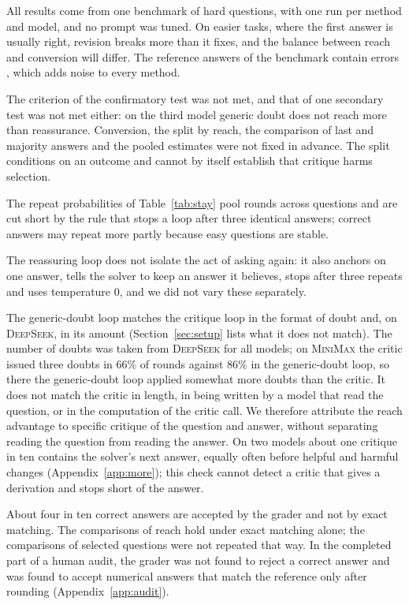 \documentclass[11pt]{article}
\newcommand{\ds}{\textsc{DeepSeek}}
\newcommand{\mm}{\textsc{MiniMax}}
\begin{document}
All results come from one benchmark of hard questions, with one run per method and model, and no prompt was tuned.
On easier tasks, where the first answer is usually right, revision breaks more than it fixes, and the balance between reach and conversion will differ.
The reference answers of the benchmark contain errors \citep{zhai2026hleverified}, which adds noise to every method.

The criterion of the confirmatory test was not met, and that of one secondary test was not met either: on the third model generic doubt does not reach more than reassurance.
Conversion, the split by reach, the comparison of last and majority answers and the pooled estimates were not fixed in advance.
The split conditions on an outcome and cannot by itself establish that critique harms selection.

The repeat probabilities of Table~\ref{tab:stay} pool rounds across questions and are cut short by the rule that stops a loop after three identical answers; correct answers may repeat more partly because easy questions are stable.

The reassuring loop does not isolate the act of asking again: it also anchors on one answer, tells the solver to keep an answer it believes, stops after three repeats and uses temperature 0, and we did not vary these separately.

The generic-doubt loop matches the critique loop in the format of doubt and, on \ds, in its amount (Section~\ref{sec:setup} lists what it does not match).
The number of doubts was taken from \ds{} for all models; on \mm{} the critic issued three doubts in 66\% of rounds against 86\% in the generic-doubt loop, so there the generic-doubt loop applied somewhat more doubts than the critic.
It does not match the critic in length, in being written by a model that read the question, or in the computation of the critic call.
We therefore attribute the reach advantage to specific critique of the question and answer, without separating reading the question from reading the answer.
On two models about one critique in ten contains the solver's next answer, equally often before helpful and harmful changes (Appendix~\ref{app:more}); this check cannot detect a critic that gives a derivation and stops short of the answer.

About four in ten correct answers are accepted by the grader and not by exact matching.
The comparisons of reach hold under exact matching alone; the comparisons of selected questions were not repeated that way.
In the completed part of a human audit, the grader was not found to reject a correct answer and was found to accept numerical answers that match the reference only after rounding (Appendix~\ref{app:audit}).
\end{document}

